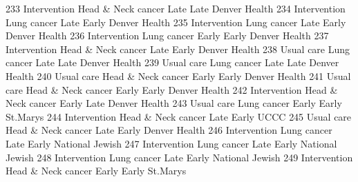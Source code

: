 \documentclass[
  letterpaper,
  DIV=11,
  numbers=noendperiod]{scrreprt}
\newenvironment{Shaded}{\begin{snugshade}}{\end{snugshade}}
\newcommand{\NormalTok}[1]{\textcolor[rgb]{0.00,0.23,0.31}{#1}}
\begin{document}
\begin{Shaded}
\begin{Highlighting}[]
\NormalTok{233 Intervention Head \& Neck cancer    Late  Late   Denver Health}
\NormalTok{234 Intervention        Lung cancer    Late Early   Denver Health}
\NormalTok{235 Intervention        Lung cancer    Late Early   Denver Health}
\NormalTok{236 Intervention        Lung cancer   Early Early   Denver Health}
\NormalTok{237 Intervention Head \& Neck cancer    Late Early   Denver Health}
\NormalTok{238   Usual care        Lung cancer    Late  Late   Denver Health}
\NormalTok{239   Usual care        Lung cancer    Late  Late   Denver Health}
\NormalTok{240   Usual care Head \& Neck cancer   Early Early   Denver Health}
\NormalTok{241   Usual care Head \& Neck cancer   Early Early   Denver Health}
\NormalTok{242 Intervention Head \& Neck cancer   Early  Late   Denver Health}
\NormalTok{243   Usual care        Lung cancer   Early Early        St.Marys}
\NormalTok{244 Intervention Head \& Neck cancer    Late Early            UCCC}
\NormalTok{245   Usual care Head \& Neck cancer    Late Early   Denver Health}
\NormalTok{246 Intervention        Lung cancer    Late Early National Jewish}
\NormalTok{247 Intervention        Lung cancer    Late Early National Jewish}
\NormalTok{248 Intervention        Lung cancer    Late Early National Jewish}
\NormalTok{249 Intervention Head \& Neck cancer   Early Early        St.Marys}
\end{Highlighting}
\end{Shaded}
\end{document}
